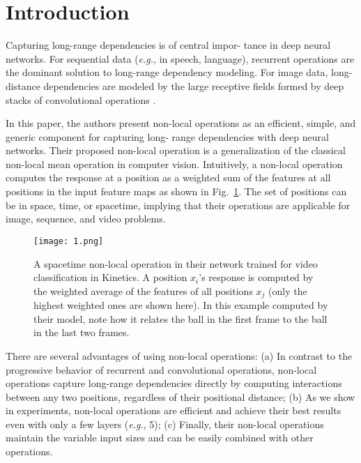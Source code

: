 \documentclass[10pt,twocolumn,letterpaper]{article}
\begin{document}
\section{Introduction}
Capturing long-range dependencies is of central impor-
tance in deep neural networks. For sequential data (\textit{e.g.},
in speech, language), recurrent operations \cite{rumelhart1986learning,hochreiter1997long} are the
dominant solution to long-range dependency modeling. For
image data, long-distance dependencies are modeled by the
large receptive fields formed by deep stacks of convolutional
operations \cite{fukushima1982neocognitron}. 
\par
In this paper, the authors present non-local operations as an efficient, simple, and generic component for capturing long-
range dependencies with deep neural networks. Their proposed non-local operation is a generalization of the classical
non-local mean operation \cite{buades2005non} in computer vision. Intuitively,
a non-local operation computes the response at a position
as a weighted sum of the features at all positions in the input feature maps as shown in Fig.~\ref{fig1}. The set of positions can be in space, time, or spacetime, implying that their operations are
applicable for image, sequence, and video problems.
\begin{figure}
	\centering
	\texttt{[image: 1.png]}
	\caption{A spacetime non-local operation in their network trained
		for video classification in Kinetics. A position $x_i$'s response is
		computed by the weighted average of the features of all positions
		$x_j$ (only the highest weighted ones are shown here). In this example
		computed by their model, note how it relates the ball in the first frame
		to the ball in the last two frames.}
	\label{fig1}
\end{figure}
\par
There are several advantages of using non-local operations: (a) In contrast to the progressive behavior of recurrent
and convolutional operations, non-local operations capture
long-range dependencies directly by computing interactions
between any two positions, regardless of their positional distance; (b) As we show in experiments, non-local operations
are efficient and achieve their best results even with only
a few layers (\textit{e.g.}, 5); (c) Finally, their non-local operations
maintain the variable input sizes and can be easily combined
with other operations.
\end{document}
